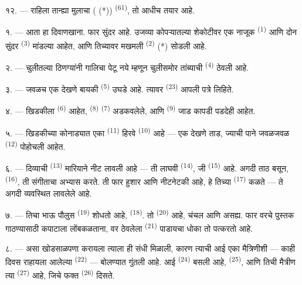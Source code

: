 १२. --- राहिला तान्ह्या मुलाचा ( (*))  \textsuperscript{(61)}, तो
आधीच तयार आहे.

\VUsaut{5.0mm}
\VUsaut{3.0mm}

१. --- आता हा दिवाणखाना. फार सुंदर  आहे. उजव्या कोपऱ्यातल्या शेकोटीवर एक नाजूक
 \textsuperscript{(1)} आणि दोन सुंदर  \textsuperscript{(3)}
मांडल्या आहेत, आणि तिच्यावर मखमली  \textsuperscript{(2)} (*) सोडली आहे.

२. --- चुलीतल्या ठिणग्यांनी गालिचा पेटू नये म्हणून चुलीसमोर तांब्याची 
\textsuperscript{(4)} ठेवली आहे.

३. --- जवळच एक देखणे बायकी  \textsuperscript{(5)} उघडे आहे. त्यावर
 \textsuperscript{(23)} आपली पत्रे लिहिते.

४. --- खिडकीला  \textsuperscript{(6)} आहेत, 
\textsuperscript{(8)}  \textsuperscript{(7)} अडकवलेले, आणि
 \textsuperscript{(9)} जाड कापडी पडदेही आहेत.

५. --- खिडकीच्या कोनाड्यात एका  \textsuperscript{(11)} हिरवे 
\textsuperscript{(10)} आहे — एक देखणे ताड, ज्याची पाने जवळजवळ 
\textsuperscript{(12)} पोहोचली आहेत.

६. --- दिव्याची  \textsuperscript{(13)} मारियाने नीट लावली आहे — ती लाघवी
 \textsuperscript{(14)}, जी  \textsuperscript{(15)} आहे. अगदी
ताठ बसून,  \textsuperscript{(16)}, ती संगीताचा अभ्यास करते. ती फार हुशार आणि
नीटनेटकी आहे, हे तिच्या  \textsuperscript{(17)} कळते — ते अगदी
व्यवस्थित लावलेले आहे.

\VUsaut{5.0mm}
\VUsaut{3.0mm}

७. --- तिचा भाऊ पौलुस  \textsuperscript{(19)} शोधतो आहे,
 \textsuperscript{(18)}. तो  \textsuperscript{(20)}
आहे, चंचल आणि असह्य. फार वरचे पुस्तक गाठण्यासाठी कपाटाला लोंबकळताना, वर ठेवलेला
 \textsuperscript{(21)} पाडायचा धोका तो पत्करतो आहे.

८. --- असा खोडसाळपणा करायला त्याला ही संधी मिळाली, कारण त्याची आई एका मैत्रिणीशी — काही दिवस
राहायला आलेल्या  \textsuperscript{(22)} — बोलण्यात गुंतली आहे. आई
 \textsuperscript{(24)} बसली आहे, 
\textsuperscript{(25)}, आणि तिची मैत्रीण त्या  \textsuperscript{(27)} आहे,
जिचे फक्त  \textsuperscript{(26)} दिसते.

